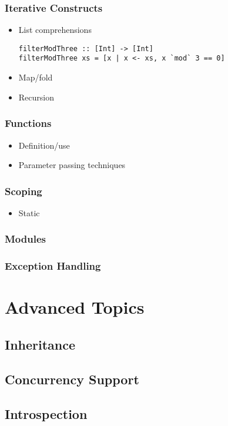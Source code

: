 \documentclass[titlepage,12pt]{article}
\newcommand{\bi}{\begin{itemize}}
\newcommand{\ei}{\end{itemize}}
\begin{document}
\subsubsection{Iterative Constructs}
\bi
    \item List comprehensions
\begin{verbatim}
filterModThree :: [Int] -> [Int]
filterModThree xs = [x | x <- xs, x `mod` 3 == 0]
\end{verbatim}
    \item Map/fold
    \item Recursion
\ei

\subsubsection{Functions}
\bi
    \item Definition/use
    \item Parameter passing techniques
\ei

\subsubsection{Scoping}
\bi
    \item Static
\ei

\subsubsection{Modules}

\subsubsection{Exception Handling}


\section{Advanced Topics}

\subsection{Inheritance}
\subsection{Concurrency Support}
\subsection{Introspection}



\end{document}
